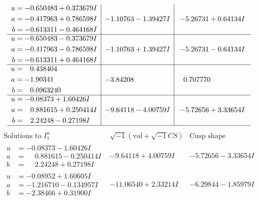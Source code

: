 \documentclass[1p]{elsarticle_modified}
\theoremstyle{definition}
\newcommand{\I}{\sqrt{-1}}
\begin{document}
$$\begin{array}{c|c|c}
\begin{aligned}
u &= -0.650483 + 0.373679 I \\
a &= -0.417963 + 0.786598 I \\
b &= -0.613311 - 0.464168 I\end{aligned}
 & -1.10763 - 1.39427 I & -5.26731 + 0.64134 I \\ \hline\begin{aligned}
u &= -0.650483 - 0.373679 I \\
a &= -0.417963 - 0.786598 I \\
b &= -0.613311 + 0.464168 I\end{aligned}
 & -1.10763 + 1.39427 I & -5.26731 - 0.64134 I \\ \hline\begin{aligned}
u &= \phantom{-}0.438404\phantom{ +0.000000I} \\
a &= -1.90341\phantom{ +0.000000I} \\
b &= \phantom{-}0.0963240\phantom{ +0.000000I}\end{aligned}
 & -3.84208\phantom{ +0.000000I} & \phantom{-}0.707770\phantom{ +0.000000I} \\ \hline\begin{aligned}
u &= -0.08373 + 1.60426 I \\
a &= \phantom{-}0.881615 + 0.250414 I \\
b &= \phantom{-}2.24248 - 0.27198 I\end{aligned}
 & -9.64118 - 4.00759 I & -5.72656 + 3.33654 I\\
 \hline 
 \end{array}$$\newpage$$\begin{array}{c|c|c}  
\text{Solutions to }I^u_{1}& \I (\text{vol} + \sqrt{-1}CS) & \text{Cusp shape}\\
 \hline 
\begin{aligned}
u &= -0.08373 - 1.60426 I \\
a &= \phantom{-}0.881615 - 0.250414 I \\
b &= \phantom{-}2.24248 + 0.27198 I\end{aligned}
 & -9.64118 + 4.00759 I & -5.72656 - 3.33654 I \\ \hline\begin{aligned}
u &= -0.08952 + 1.60605 I \\
a &= -1.216710 - 0.134957 I \\
b &= -2.38466 + 0.31900 I\end{aligned}
 & -11.06540 + 2.33214 I & -6.29844 - 1.85979 I \\ \hline\begin{aligned}

\end{aligned}
\end{array}$$
\end{document}
